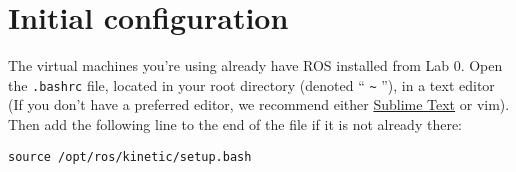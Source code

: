 \documentclass{article}
\begin{document}

\section{Initial configuration}
The virtual machines you're using already have ROS installed from Lab 0. Open the \verb=.bashrc= file, located in your root directory (denoted `` \verb=~= ''), in a text editor (If you don't have a preferred editor, we recommend either \href{https://www.sublimetext.com/}{Sublime Text} or vim). Then add the following line to the end of the file if it is not already there:
\begin{Verbatim}[frame=single]
source /opt/ros/kinetic/setup.bash
\end{Verbatim}
\end{document}

